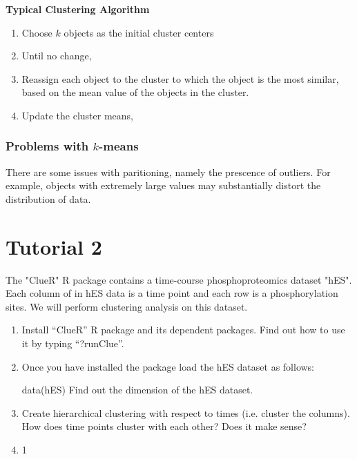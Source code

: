 \documentclass[twoside]{article}
\theoremstyle{definition}
\theoremstyle{definition}
\begin{document}
\begin{dBox}
	\textbf{Typical Clustering Algorithm}
	\begin{enumerate}
		\item Choose $k$ objects as the initial cluster centers
		\item Until no change, 
		\item Reassign each object to the cluster to which the object is the most similar, based on the mean value of the objects in the cluster.
		\item Update the cluster means, 
	\end{enumerate}
\end{dBox}

\subsubsection{Problems with $k$-means}
There are some issues with paritioning, namely the prescence of outliers. For example, objects with extremely large values may substantially distort the distribution of data. 

\section{Tutorial 2}

The "ClueR" R package contains a time-course phosphoproteomics dataset "hES". Each
column of in hES data is a time point and each row is a phosphorylation sites. We will
perform clustering analysis on this dataset.

\begin{enumerate}
  \item Install “ClueR” R package and its dependent packages. Find out how to use it by
typing “?runClue”.

\item Once you have installed the package load the hES dataset as follows:

data(hES)
Find out the dimension of the hES dataset.

\item Create hierarchical clustering with respect to times (i.e. cluster the columns). How
does time points cluster with each other? Does it make sense?

\item 1
\end{enumerate}
\end{document}
